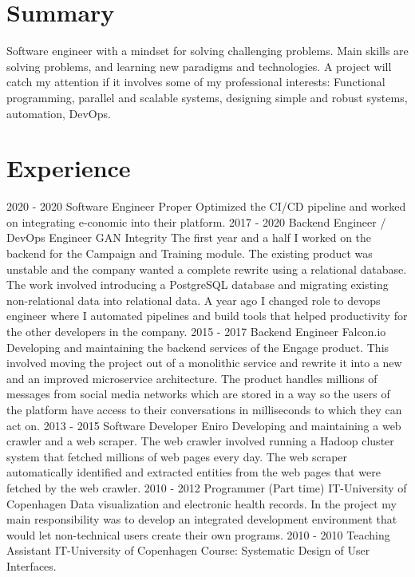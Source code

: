 \documentclass[]{friggeri-cv}
\begin{document}
\section{Summary}
Software engineer with a mindset for solving challenging problems. Main skills are solving problems, and learning new paradigms and technologies. A project will catch my attention if it involves some of my professional interests: Functional programming, parallel and scalable systems, designing simple and robust systems, automation, DevOps.

\section{Experience}
\begin{entrylist}
    \entry
    {2020 - 2020}
    {Software Engineer}
    {Proper}
    {Optimized the CI/CD pipeline and worked on integrating e-conomic into their platform.}
    \entry
    {2017 - 2020}
    {Backend Engineer / DevOps Engineer}
    {GAN Integrity}
    {The first year and a half I worked on the backend for the Campaign and Training module. The existing product was unstable and the company wanted a complete rewrite using a relational database.  
    The work involved introducing a PostgreSQL database and migrating existing non-relational data into relational data.
    A year ago I changed role to devops engineer where I automated pipelines and build tools that helped productivity for the other developers in the company.}
    \entry
    {2015 - 2017}
    {Backend Engineer}
    {Falcon.io}
    {Developing and maintaining the backend services of the Engage product. This involved moving the project out of a monolithic service and rewrite it into a new and an improved microservice architecture. The product handles millions of messages from social media networks which are stored in a way so the users of the platform have access to their conversations in milliseconds to which they can act on.}
    \entry
    {2013 - 2015}
    {Software Developer}
    {Eniro}
    {Developing and maintaining a web crawler and a web scraper. The web crawler involved running a Hadoop cluster system that fetched millions of web pages every day. The web scraper automatically identified and extracted entities from the web pages that were fetched by the web crawler.}
    \entry
    {2010 - 2012}
    {Programmer (Part time)}
    {IT-University of Copenhagen}
    {Data visualization and electronic health records. In the project my main responsibility was to develop an integrated development environment that would let non-technical users create their own programs.}
    \entry
    {2010 - 2010}
    {Teaching Assistant}
    {IT-University of Copenhagen}
    {Course: Systematic Design of User Interfaces.}


\end{entrylist}
\end{document}
